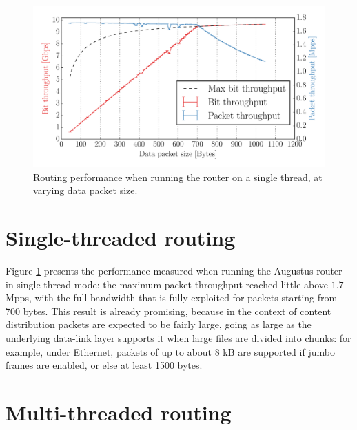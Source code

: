 \documentclass[11pt,a4paper,twoside,titlepage,openany]{book}
\begin{document}
\begin{figure}[tb]
  \begin{center}
    \includegraphics[width=1.0\textwidth]{img/augustus_increasing_len_0x1.pdf}
    \caption[Single-threaded routing performance at varying data packet size]{Routing performance when running the router on a single thread, at varying data packet size.}
    \label{fig:test.incr_len_single}
  \end{center}
\end{figure}
\section{Single-threaded routing}\label{sec:test.singlecore}
Figure \ref{fig:test.incr_len_single} presents the performance measured when running the Augustus router in single-thread mode: the maximum packet throughput reached little above $1.7$ \acrfull{Mpps}, with the full bandwidth that is fully exploited for packets starting from 700 bytes. This result is already promising, because in the context of content distribution packets are expected to be fairly large, going as large as the underlying data-link layer supports it when large files are divided into chunks: for example, under Ethernet, packets of up to about 8 kB are supported if jumbo frames are enabled, or else at least 1500 bytes.

\section{Multi-threaded routing}\label{sec:test.multicore}
\end{document}
